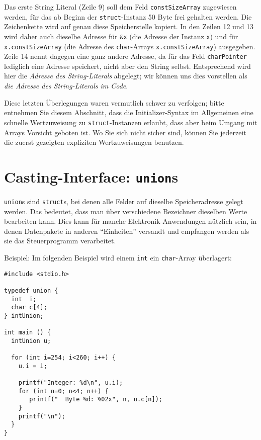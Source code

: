 Das erste String Literal (Zeile 9) soll dem Feld \texttt{constSizeArray} zugewiesen werden, für das ab Beginn der \texttt{struct}-Instanz 50 Byte frei gehalten werden. Die Zeichenkette wird auf genau diese Speicherstelle kopiert. In den Zeilen 12 und 13 wird daher auch dieselbe Adresse für \texttt{\&x} (die Adresse der Instanz \texttt{x}) und für \texttt{x.constSizeArray} (die Adresse des \texttt{char}-Arrays \texttt{x.constSizeArray}) ausgegeben. Zeile 14 nennt dagegen eine ganz andere Adresse, da für das Feld \texttt{charPointer} lediglich eine Adresse speichert, nicht aber den String selbst. Entsprechend wird hier die \emph{Adresse des String-Literals} abgelegt; wir können uns dies vorstellen als \emph{die Adresse des String-Literals im Code}.

Diese letzten Überlegungen waren vermutlich schwer zu verfolgen; bitte entnehmen Sie diesem Abschnitt, dass die Initializer-Syntax im Allgemeinen eine schnelle Wertzuweisung zu \texttt{struct}-Instanzen erlaubt, dass aber beim Umgang mit Arrays Vorsicht geboten ist. Wo Sie sich nicht sicher sind, können Sie jederzeit die zuerst gezeigten expliziten Wertzuweisungen benutzen.

\section{Casting-Interface: \texttt{union}s}
\texttt{union}s sind \texttt{struct}s, bei denen alle Felder auf dieselbe Speicheradresse gelegt werden. Das bedeutet, dass man über verschiedene Bezeichner dieselben Werte bearbeiten kann. Dies kann für manche Elektronik-Anwendungen nützlich sein, in denen Datenpakete in anderen \enquote{Einheiten} versandt und empfangen werden als sie das Steuerprogramm verarbeitet.

Beispiel: Im folgenden Beispiel wird einem \texttt{int} ein \texttt{char}-Array überlagert:

\begin{codebox}
\begin{verbatim}
#include <stdio.h>

typedef union {
  int  i;
  char c[4];
} intUnion;

int main () {
  intUnion u;

  for (int i=254; i<260; i++) {
    u.i = i;

    printf("Integer: %d\n", u.i);
    for (int n=0; n<4; n++) {
       printf("  Byte %d: %02x", n, u.c[n]);
    }
    printf("\n");
  }
}
\end{verbatim}
\end{codebox}

